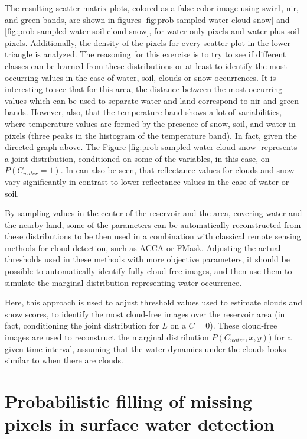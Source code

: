 The resulting scatter matrix plots, colored as a false-color image using swir1, nir, and green bands, are shown in figures \ref{fig:prob-sampled-water-cloud-snow} and \ref{fig:prob-sampled-water-soil-cloud-snow}, for water-only pixels and water plus soil pixels. Additionally, the density of the pixels for every scatter plot in the lower triangle is analyzed. The reasoning for this exercise is to try to see if different classes can be learned from these distributions or at least to  identify the most occurring values in the case of water, soil, clouds or snow occurrences. It is interesting to see that for this area, the distance between the most occurring values which can be used to separate water and land correspond to nir and green bands. However, also, that the temperature band shows a lot of variabilities, where temperature values are formed by the presence of snow, soil, and water in pixels (three peaks in the histogram of the temperature band). In fact, given the directed graph above. The Figure \ref{fig:prob-sampled-water-cloud-snow} represents a joint distribution, conditioned on some of the variables, in this case, on $P(C_{water}=1)$. In can also be seen, that reflectance values for clouds and snow vary significantly in contrast to lower reflectance values in the case of water or soil. 

By sampling values in the center of the reservoir and the area, covering water and the nearby land, some of the parameters can be automatically reconstructed from these distributions to be then used in a combination with classical remote sensing methods for cloud detection, such as ACCA or FMask. Adjusting the actual thresholds used in these methods with more objective parameters, it should be possible to automatically identify fully cloud-free images, and then use them to simulate the marginal distribution representing water occurrence. 

Here, this approach is used to adjust threshold values used to estimate clouds and snow scores, to identify the most cloud-free images over the reservoir area (in fact, conditioning the joint distribution for $L$ on a $C=0$). These cloud-free images are used to reconstruct the marginal distribution $P(C_{water}, x, y))$ for a given time interval, assuming that the water dynamics under the clouds looks similar to when there are clouds.

\section{Probabilistic filling of missing pixels in surface water detection}


